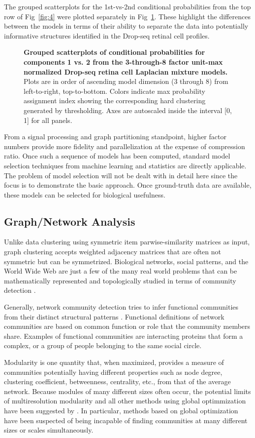 \documentclass[10pt,letterpaper]{article}
\begin{document}
The grouped scatterplots for the 1st-vs-2nd conditional probabilities from the top row of Fig~\ref{fig:4} were plotted separately in Fig~\ref{fig:5}.
These highlight the differences between the models in terms of their ability to separate the data into potentially informative structures identified in the Drop-seq retinal cell profiles.
\begin{figure}[!h]
\caption{
{\bf Grouped scatterplots of conditional probabilities for components 1 vs. 2  from the 3-through-8 factor unit-max normalized Drop-seq retina cell Laplacian mixture models.}
Plots are in order of ascending model dimension (3 through 8) from left-to-right, top-to-bottom.
Colors indicate max probability assignment index showing the corresponding hard clustering generated by thresholding.
Axes are autoscaled inside the interval [0, 1] for all panels.
}
\label{fig:5}
\end{figure}
From a signal processing and graph partitioning standpoint, higher factor numbers provide more fidelity and parallelization at the expense of compression ratio.
Once such a sequence of models has been computed, standard model selection techniques from machine learning and statistics are directly applicable.
The problem of model selection will not be dealt with in detail here since the focus is to demonstrate the basic approach.
Once ground-truth data are available, these models can be selected for biological usefulness.
\subsection*{Graph/Network Analysis}
Unlike data clustering using symmetric item parwise-similarity matrices as input, graph clustering accepts weighted adjacency matrices that are often not symmetric but can be symmetrized.
Biological networks, social patterns, and the World Wide Web are just a few of the many real world problems that can be mathematically represented and topologically studied in terms of community detection \cite{communities}.

Generally, network community detection tries to infer functional communities from their distinct structural patterns \cite{yang2015}.
Functional definitions of network communities are based on common function or role that the community members share.
Examples of functional communities are interacting proteins that form a complex, or a group of people belonging to the same social circle.

Modularity is one quantity that, when maximized, provides a measure of communities potentially having different properties such as node degree, clustering coefficient, betweenness, centrality, etc., from that of the average network.
Because modules of many different sizes often occur, the potential limits of multiresolution modularity and all other methods using global optimmization have been suggested by \cite{modularity}.
In particular, methods based on global optimization have been suspected of being incapable of finding communities at many different sizes or scales simultaneously.
\end{document}
